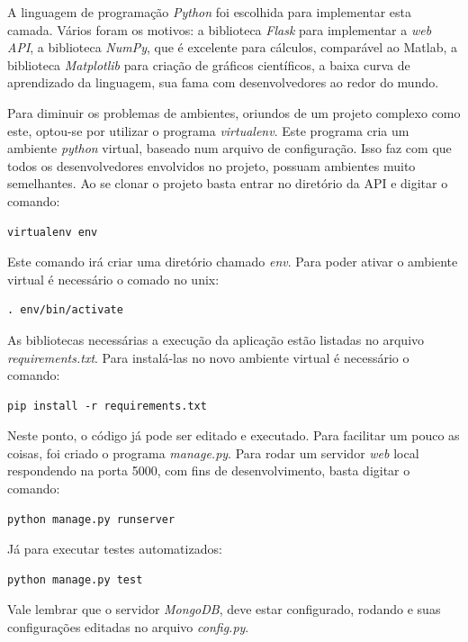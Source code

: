 A linguagem de programação \emph{Python} foi escolhida para implementar esta camada. Vários foram os motivos: a biblioteca \emph{Flask} para implementar a \emph{web API}, a biblioteca \emph{NumPy}, que é excelente para cálculos, comparável ao Matlab, a biblioteca \emph{Matplotlib} para criação de gráficos científicos, a baixa curva de aprendizado da linguagem, sua fama com desenvolvedores ao redor do mundo.

Para diminuir os problemas de ambientes, oriundos de um projeto complexo como este, optou-se por utilizar o programa \emph{virtualenv}. Este programa cria um ambiente \emph{python} virtual, baseado num arquivo de configuração. Isso faz com que todos os desenvolvedores envolvidos no projeto, possuam ambientes muito semelhantes.
Ao se clonar o projeto basta entrar no diretório da API e digitar o comando:
\lstset{language=bash}
\begin{lstlisting}[frame=single]
virtualenv env
\end{lstlisting}

Este comando irá criar uma diretório chamado \emph{env}. Para poder ativar o ambiente virtual é necessário o comado no unix:
\lstset{language=bash}
\begin{lstlisting}[frame=single]
. env/bin/activate
\end{lstlisting}

As bibliotecas necessárias a execução da aplicação estão listadas no arquivo \emph{requirements.txt}. Para instalá-las no novo ambiente virtual é necessário o comando:
\lstset{language=bash}
\begin{lstlisting}[frame=single]
pip install -r requirements.txt
\end{lstlisting}

Neste ponto, o código já pode ser editado e executado. Para facilitar um pouco as coisas, foi criado o programa \emph{manage.py}. Para rodar um servidor \emph{web} local respondendo na porta 5000, com fins de desenvolvimento, basta digitar o comando:
\lstset{language=bash}
\begin{lstlisting}[frame=single]
python manage.py runserver
\end{lstlisting}

Já para executar testes automatizados:
\lstset{language=bash}
\begin{lstlisting}[frame=single]
python manage.py test
\end{lstlisting}

Vale lembrar que o servidor \emph{MongoDB}, deve estar configurado, rodando e suas configurações editadas no arquivo \emph{config.py}.


